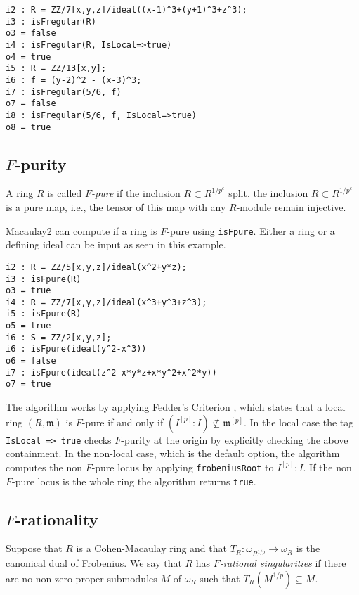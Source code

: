 \documentclass[11pt]{amsart}
\begin{document}
\begin{verbatim}
i2 : R = ZZ/7[x,y,z]/ideal((x-1)^3+(y+1)^3+z^3);
i3 : isFregular(R)
o3 = false
i4 : isFregular(R, IsLocal=>true)
o4 = true
i5 : R = ZZ/13[x,y];
i6 : f = (y-2)^2 - (x-3)^3;
i7 : isFregular(5/6, f)
o7 = false
i8 : isFregular(5/6, f, IsLocal=>true)
o8 = true
\end{verbatim}

\subsection{$F$-purity}
\begin{definition}
A ring $R$ is called \emph{$F$-pure} if 
\sout{the inclusion $R \subset R^{1/p^{e}}$ split.}
the inclusion $R \subset R^{1/p^{e}}$ is a pure map, i.e.,
the tensor of this map with any $R$-module remain injective.
\end{definition}

Macaulay2 can compute if a ring is $F$-pure using {\tt isFpure}. Either a
ring or a defining ideal can be input as seen in this example.


\begin{verbatim}
i2 : R = ZZ/5[x,y,z]/ideal(x^2+y*z);
i3 : isFpure(R)
o3 = true
i4 : R = ZZ/7[x,y,z]/ideal(x^3+y^3+z^3);
i5 : isFpure(R)
o5 = true
i6 : S = ZZ/2[x,y,z];
i6 : isFpure(ideal(y^2-x^3))
o6 = false
i7 : isFpure(ideal(z^2-x*y*z+x*y^2+x^2*y))
o7 = true
\end{verbatim}


The algorithm works by applying Fedder's Criterion {\cite{FedderFPureRat}}, which states that a
local ring $(R, \mathfrak{m})$ is $F$-pure if and only if $(I^{[p]} : I)
\not\subseteq \mathfrak{m}^{[p]}$. In the local case the tag {\tt IsLocal
=> true} checks $F$-purity at the origin by explicitly checking the above
containment. In the non-local case, which is the default option, the
algorithm computes the non $F$-pure locus by applying {\tt frobeniusRoot}
to $I^{[p]} :I$. If the non $F$-pure locus is the whole ring the algorithm
returns {\tt true}.

\subsection{$F$-rationality}

\begin{definition}
Suppose that $R$ is a Cohen-Macaulay ring and that $T_{R} :
\omega_{R^{1/p}} \rightarrow \omega_{R}$ is the canonical dual of
Frobenius. We say that $R$ has \emph{$F$-rational singularities} if there
are no non-zero proper submodules $M$ of $\omega_{R}$ such that
$T_{R}(M^{1/p}) \subseteq M$.
\end{definition}
\end{document}
